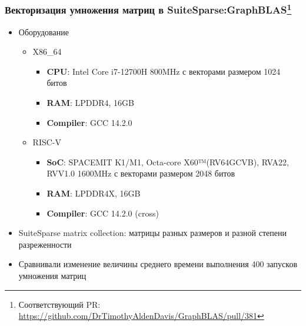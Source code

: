 \documentclass[xcolor=table,aspectratio=169]{beamer}
\begin{document}
\begin{frame}[t]
  \frametitle{Векторизация умножения матриц в SuiteSparse:GraphBLAS\footnote{Соответствующий PR: \url{https://github.com/DrTimothyAldenDavis/GraphBLAS/pull/381}}}
  \begin{itemize}    
    \item Оборудование
    \begin{itemize}
    \item X86\_64
    \begin{itemize}
  \item \textbf{CPU}: Intel Core i7-12700H 800MHz с векторами размером 1024 битов
  \item \textbf{RAM}: LPDDR4, 16GB
  \item \textbf{Compiler}: GCC 14.2.0
\end{itemize}
    \item RISC-V
    \begin{itemize}
  \item \textbf{SoC}: SPACEMIT K1/M1, Octa-core X60™(RV64GCVB), RVA22, RVV1.0 1600MHz с векторами размером 2048 битов 
  \item \textbf{RAM}: LPDDR4X, 16GB 
  \item \textbf{Compiler}: GCC 14.2.0 (cross)
\end{itemize}
    \end{itemize}
    \item SuiteSparse matrix collection: матрицы разных размеров и разной степени разреженности
    \item Сравнивали изменение величины среднего времени выполнения 400 запусков умножения матриц
  \end{itemize}  
\end{frame}
\end{document}
